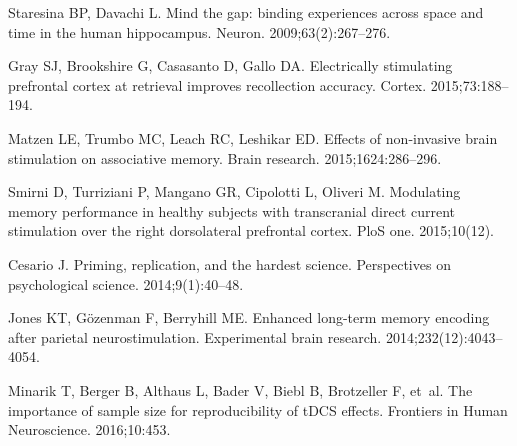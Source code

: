 \documentclass[10pt,letterpaper]{article}
\begin{document}
\begin{thebibliography}{10}
Staresina BP, Davachi L.
\newblock Mind the gap: binding experiences across space and time in the human
  hippocampus.
\newblock Neuron. 2009;63(2):267--276.

Gray SJ, Brookshire G, Casasanto D, Gallo DA.
\newblock Electrically stimulating prefrontal cortex at retrieval improves
  recollection accuracy.
\newblock Cortex. 2015;73:188--194.

Matzen LE, Trumbo MC, Leach RC, Leshikar ED.
\newblock Effects of non-invasive brain stimulation on associative memory.
\newblock Brain research. 2015;1624:286--296.

Smirni D, Turriziani P, Mangano GR, Cipolotti L, Oliveri M.
\newblock Modulating memory performance in healthy subjects with transcranial
  direct current stimulation over the right dorsolateral prefrontal cortex.
\newblock PloS one. 2015;10(12).

Cesario J.
\newblock Priming, replication, and the hardest science.
\newblock Perspectives on psychological science. 2014;9(1):40--48.

Jones KT, G{\"o}zenman F, Berryhill ME.
\newblock Enhanced long-term memory encoding after parietal neurostimulation.
\newblock Experimental brain research. 2014;232(12):4043--4054.

Minarik T, Berger B, Althaus L, Bader V, Biebl B, Brotzeller F, et~al.
\newblock The importance of sample size for reproducibility of tDCS effects.
\newblock Frontiers in Human Neuroscience. 2016;10:453.

\end{thebibliography}
\end{document}
